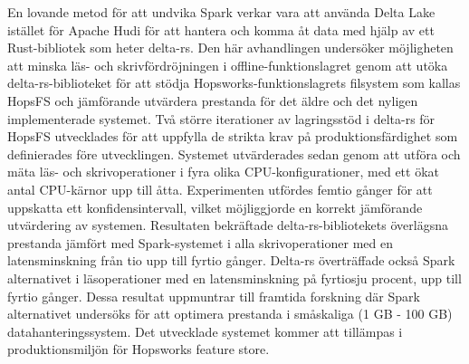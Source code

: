 \begin{scontents}[store-env=abstracts,print-env=true]
En lovande metod för att undvika Spark verkar vara att använda Delta Lake istället för Apache Hudi för att hantera och komma åt data med hjälp av ett Rust-bibliotek som heter delta-rs. Den här avhandlingen undersöker möjligheten att minska läs- och skrivfördröjningen i offline-funktionslagret genom att utöka delta-rs-biblioteket för att stödja Hopsworks-funktionslagrets filsystem som kallas HopsFS och jämförande utvärdera prestanda för det äldre och det nyligen implementerade systemet. Två större iterationer av lagringsstöd i delta-rs för HopsFS utvecklades för att uppfylla de strikta krav på produktionsfärdighet som definierades före utvecklingen. Systemet utvärderades sedan genom att utföra och mäta läs- och skrivoperationer i fyra olika CPU-konfigurationer, med ett ökat antal CPU-kärnor upp till åtta. Experimenten utfördes femtio gånger för att uppskatta ett konfidensintervall, vilket möjliggjorde en korrekt jämförande utvärdering av systemen. Resultaten bekräftade delta-rs-bibliotekets överlägsna prestanda jämfört med Spark-systemet i alla skrivoperationer med en latensminskning från tio upp till fyrtio gånger. Delta-rs överträffade också Spark alternativet i läsoperationer med en latensminskning på fyrtiosju procent, upp till fyrtio gånger. Dessa resultat uppmuntrar till framtida forskning där Spark alternativet undersöks för att optimera prestanda i småskaliga (1 GB - 100 GB) datahanteringssystem. Det utvecklade systemet kommer att tillämpas i produktionsmiljön för Hopsworks feature store.


\end{scontents}
